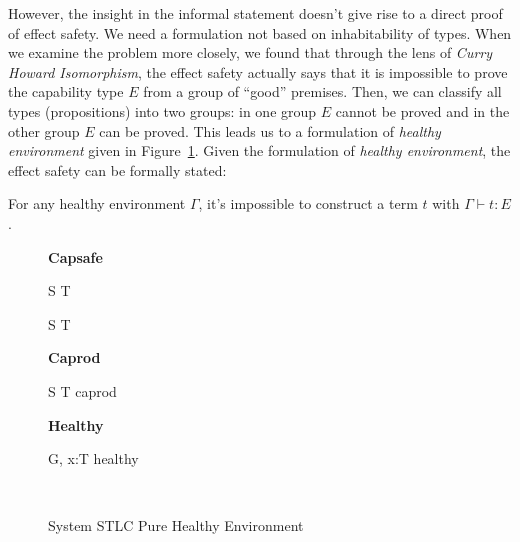 However, the insight in the informal statement doesn't give rise to a
direct proof of effect safety. We need a formulation not based on
inhabitability of types. When we examine the problem more closely, we
found that through the lens of \emph{Curry Howard Isomorphism}, the
effect safety actually says that it is impossible to prove the
capability type $E$ from a group of ``good'' premises. Then, we can
classify all types (propositions) into two groups: in one group $E$
cannot be proved and in the other group $E$ can be proved. This leads
us to a formulation of \emph{healthy environment} given in
Figure~\ref{fig:stlc-pure-healthy-definition}. Given the formulation
of \emph{healthy environment}, the effect safety can be formally
stated:

\begin{definition}
  For any healthy environment $\Gamma$, it's impossible to construct a
  term $t$ with $\Gamma \vdash t : E$.
\end{definition}

\begin{figure}[ht]
\begin{framed}
\begin{multicols}{2}

\textbf{Capsafe}


{ S \to T \quad {} }

{ S \to T \quad {} }

\columnbreak

\textbf{Caprod}


{ S \to T \quad caprod }

\textbf{Healthy}


{ G, \; x:T \quad healthy }


\hfill\\

\end{multicols}
\end{framed}

\caption{System STLC Pure Healthy Environment}
\label{fig:stlc-pure-healthy-definition}
\end{figure}

